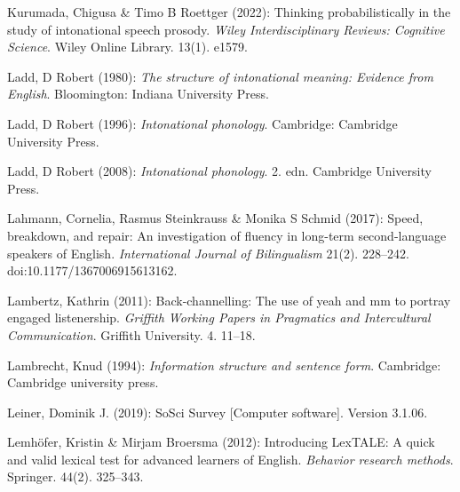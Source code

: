 \begin{styleBibliography}
Kurumada, Chigusa \& Timo B Roettger (2022): Thinking probabilistically in the study of intonational speech prosody. \textit{Wiley Interdisciplinary Reviews: Cognitive Science}. Wiley Online Library. 13(1). e1579.
\end{styleBibliography}

\begin{styleBibliography}
Ladd, D Robert (1980): \textit{The structure of intonational meaning: Evidence from English}. Bloomington: Indiana University Press.
\end{styleBibliography}

\begin{styleBibliography}
Ladd, D Robert (1996): \textit{Intonational phonology}. Cambridge: Cambridge University Press.
\end{styleBibliography}

\begin{styleBibliography}
Ladd, D Robert (2008): \textit{Intonational phonology}. 2. edn. Cambridge University Press.
\end{styleBibliography}

\begin{styleBibliography}
Lahmann, Cornelia, Rasmus Steinkrauss \& Monika S Schmid (2017): Speed, breakdown, and repair: An investigation of fluency in long-term second-language speakers of English. \textit{International Journal of Bilingualism} 21(2). 228–242. doi:10.1177/1367006915613162.
\end{styleBibliography}

\begin{styleBibliography}
Lambertz, Kathrin (2011): Back-channelling: The use of yeah and mm to portray engaged listenership. \textit{Griffith Working Papers in Pragmatics and Intercultural Communication}. Griffith University. 4. 11–18.
\end{styleBibliography}

\begin{styleBibliography}
Lambrecht, Knud (1994): \textit{Information structure and sentence form}. Cambridge: Cambridge university press.
\end{styleBibliography}

\begin{styleBibliography}
Leiner, Dominik J. (2019): SoSci Survey [Computer software]. Version 3.1.06.
\end{styleBibliography}

\begin{styleBibliography}
Lemhöfer, Kristin \& Mirjam Broersma (2012): Introducing LexTALE: A quick and valid lexical test for advanced learners of English. \textit{Behavior research methods}. Springer. 44(2). 325–343.
\end{styleBibliography}

